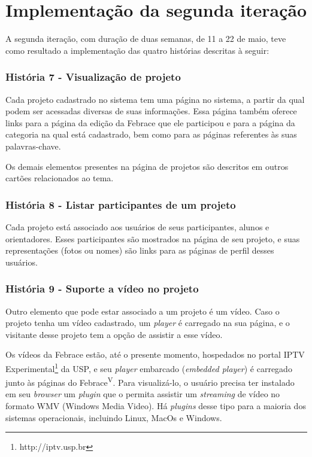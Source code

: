 \documentclass[a4paper,12pt,font=plain,header=plain]{abnt}
\begin{document}
  \section{Implementação da segunda iteração}
    A segunda iteração, com duração de duas semanas, de 11 a 22 de maio, teve como resultado a implementação das quatro histórias descritas à seguir:

    \subsubsection{História 7 - Visualização de projeto}
      Cada projeto cadastrado no sistema tem uma página no sistema, a partir da qual podem ser acessadas diversas de suas informações. Essa página também oferece links para a página da edição da Febrace que ele participou e para a página da categoria na qual está cadastrado, bem como para as páginas referentes às suas palavras-chave.

      Os demais elementos presentes na página de projetos são descritos em outros cartões relacionados ao tema.

    \subsubsection{História 8 - Listar participantes de um projeto}
      Cada projeto está associado aos usuários de seus participantes, alunos e orientadores. Esses participantes são mostrados na página de seu projeto, e suas representações (fotos ou nomes) são links para as páginas de perfil desses usuários.

    \subsubsection{História 9 - Suporte a vídeo no projeto}
      Outro elemento que pode estar associado a um projeto é um vídeo. Caso o projeto tenha um vídeo cadastrado, um \textit{player} é carregado na sua página, e o visitante desse projeto tem a opção de assistir a esse vídeo.

      Os vídeos da Febrace estão, até o presente momento, hospedados no portal IPTV Experimental\footnote{http://iptv.usp.br} da USP, e seu \textit{player} embarcado (\textit{embedded player}) é carregado junto às páginas do Febrace\textsuperscript{V}. Para visualizá-lo, o usuário precisa ter instalado em seu \textit{browser} um \textit{plugin} que o permita assistir um \textit{streaming} de vídeo no formato WMV (Windows Media Video). Há \textit{plugins} desse tipo para a maioria dos sistemas operacionais, incluindo Linux, MacOs e Windows.
\end{document}
